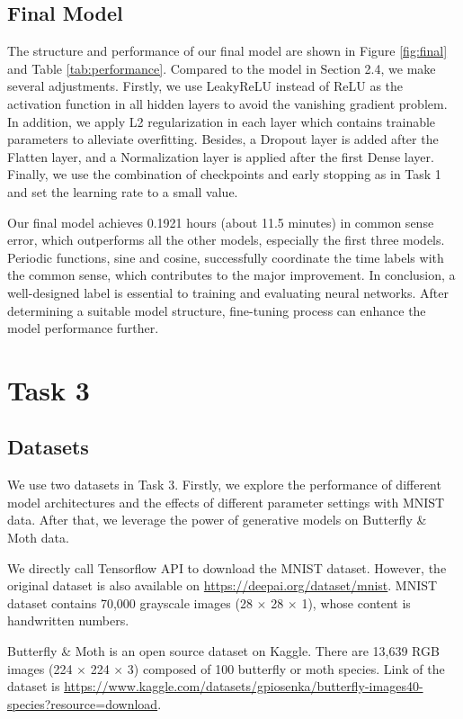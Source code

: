 \documentclass{article}
\begin{document}
\subsection{Final Model}
The structure and performance of our final model are shown in Figure \ref{fig:final} and Table \ref{tab:performance}. Compared to the model in Section 2.4, we make several adjustments. Firstly, we use LeakyReLU instead of ReLU as the activation function in all hidden layers to avoid the vanishing gradient problem. In addition, we apply L2 regularization in each layer which contains trainable parameters to alleviate overfitting. Besides, a Dropout layer is added after the Flatten layer, and a Normalization layer is applied after the first Dense layer. Finally, we use the combination of checkpoints and early stopping as in Task 1 and set the learning rate to a small value.

Our final model achieves 0.1921 hours (about 11.5 minutes) in common sense error, which outperforms all the other models, especially the first three models. Periodic functions, sine and cosine, successfully coordinate the time labels with the common sense, which contributes to the major improvement. In conclusion, a well-designed label is essential to training and evaluating neural networks. After determining a suitable model structure, fine-tuning process can enhance the model performance further.

\section*{Task 3}
\setcounter{section}{3}
\setcounter{subsection}{0}
\subsection{Datasets}
We use two datasets in Task 3. Firstly, we explore the performance of different model architectures and the effects of different parameter settings with MNIST data. After that, we leverage the power of generative models on Butterfly \& Moth data. \par
We directly call Tensorflow API to download the MNIST dataset. However, the original dataset is also available on \url{https://deepai.org/dataset/mnist}. MNIST dataset contains 70,000 grayscale images (28 $\times$ 28 $\times$ 1), whose content is handwritten numbers. \par
Butterfly \& Moth is an open source dataset on Kaggle. There are 13,639 RGB images (224 $\times$ 224 $\times$ 3) composed of 100 butterfly or moth species. Link of the dataset is \url{https://www.kaggle.com/datasets/gpiosenka/butterfly-images40-species?resource=download}.
\end{document}
